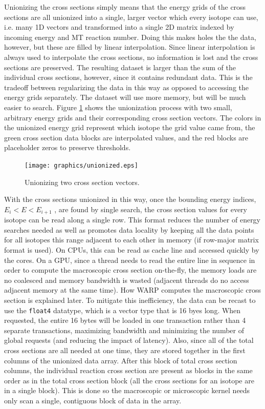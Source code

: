 Unionizing the cross sections simply means that the energy grids of the cross sections are all unionized into a single, larger vector which every isotope can use, i.e. many 1D vectors and transformed into a single 2D matrix indexed by incoming energy and MT reaction number.  Doing this makes holes the the data, however, but these are filled by linear interpolation.  Since linear interpolation is always used to interpolate the cross sections, no information is lost and the cross sections are preserved.  The resulting dataset is larger than the sum of the individual cross sections, however, since it contains redundant data.  This is the tradeoff between regularizing the data in this way as opposed to accessing the energy grids separately.  The dataset will use more memory, but will be much easier to search.  Figure \ref{unionized_layout} shows the unionization process with two small, arbitrary energy grids and their corresponding cross section vectors.  The colors in the unionized energy grid represent which isotope the grid value came from, the green cross section data blocks are interpolated values, and the red blocks are placeholder zeros to preserve thresholds.

\begin{figure}[h!] 
\centering
\texttt{[image: graphics/unionized.eps]}
\caption{Unionizing two cross section vectors. \label{unionized_layout} }
\end{figure}

With the cross sections unionized in this way, once the bounding energy indices, $E_i<E<E_{i+1}$ , are found by single search, the cross section values for every isotope can be read along a single row.  This format reduces the number of energy searches needed as well as promotes data locality by keeping all the data points for all isotopes this range adjacent to each other in memory (if row-major matrix format is used).  On CPUs, this can be read as cache line and accessed quickly by the cores.  On a GPU, since a thread needs to read the entire line in sequence in order to compute the macroscopic cross section on-the-fly, the memory loads are no coalesced and memory bandwidth is wasted (adjacent threads do no access adjacent memory at the same time).  How WARP computes the macroscopic cross section is explained later.  To mitigate this inefficiency, the data can be recast to use the  \lstinline{float4} datatype, which is a vector type that is 16 byes long.  When requested, the entire 16 bytes will be loaded in one transaction rather than 4 separate transactions, maximizing bandwidth and minimizing the number of global requests (and reducing the impact of latency).  Also, since all of the total cross sections are all needed at one time, they are stored together in the first columns of the unionized data array.  After this block of total cross section columns, the individual reaction cross section are present as blocks in the same order as in the total cross section block (all the cross sections for an isotope are in a single block).  This is done so the macroscopic or microscopic kernel needs only scan a single, contiguous block of data in the array.

